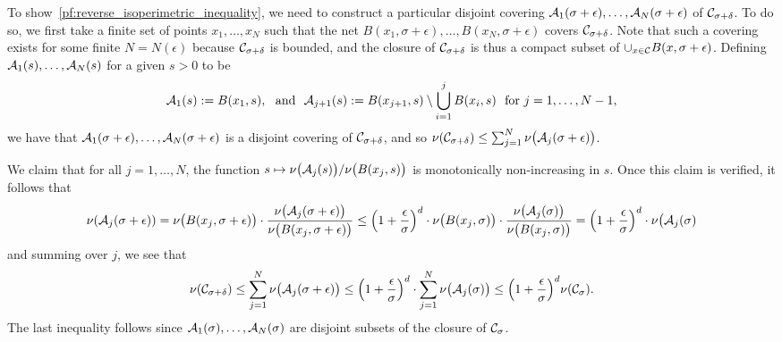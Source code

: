 	To show~\eqref{pf:reverse_isoperimetric_inequality}, we need to construct a particular disjoint covering $\mathcal{A}_1(\sigma + \epsilon), \ldots, \mathcal{A}_N(\sigma + \epsilon)$ of $\mathcal{C}_{\sigma + \delta}$. To do so, we first take a finite set of points $x_1,\ldots,x_N$ such that the net $B(x_1,\sigma + \epsilon),\ldots,B(x_N,\sigma + \epsilon)$ covers $\mathcal{C}_{\sigma + \delta}$.  Note that such a covering exists for some finite $N = N(\epsilon)$ because $\mathcal{C}_{\sigma + \delta}$ is bounded, and the closure of $\mathcal{C}_{\sigma + \delta}$ is thus a compact subset of $\cup_{x \in \mathcal{C}} B(x,\sigma + \epsilon)$. Defining $\mathcal{A}_1(s), \ldots, \mathcal{A}_N(s)$ for a given $s > 0$ to be
	\begin{equation*}
	\mathcal{A}_1(s) := B(x_1,s),~~\textrm{and}~~ \mathcal{A}_{j + 1}(s) := B(x_{j + 1},s) \setminus \bigcup_{i = 1}^{j} B(x_i,s) ~~\textrm{for $j = 1,\ldots,N - 1$},
	\end{equation*}
	we have that $\mathcal{A}_1(\sigma + \epsilon),\ldots,\mathcal{A}_N(\sigma + \epsilon)$ is a disjoint covering of $\mathcal{C}_{\sigma + \delta}$, and so $\nu(\mathcal{C}_{\sigma + \delta}) \leq \sum_{j = 1}^{N} \nu\bigl(\mathcal{A}_j(\sigma + \epsilon)\bigr)$. 
	
	We claim that for all $j = 1,\ldots,N$, the function $s \mapsto \nu\bigl(\mathcal{A}_j(s)\bigr)/\nu\bigl(B(x_j,s)\bigr)$ is monotonically non-increasing in $s$. Once this claim is verified, it follows that
	\begin{equation*}
	\nu(\mathcal{A}_j(\sigma + \epsilon)) = \nu\bigl(B(x_j,\sigma + \epsilon)\bigr) \cdot \frac{\nu\bigl(\mathcal{A}_j(\sigma + \epsilon)\bigr)}{\nu\bigl(B(x_j,\sigma + \epsilon)\bigr)} \leq \Bigl(1 + \frac{\epsilon}{\sigma}\Bigr)^d \cdot  \nu\bigl(B(x_j,\sigma)\bigr) \cdot \frac{\nu\bigl(\mathcal{A}_j(\sigma)\bigr)}{\nu\bigl(B(x_j,\sigma)\bigr)} = \Bigl(1 + \frac{\epsilon}{\sigma}\Bigr)^d \cdot \nu\bigl(\mathcal{A}_j(\sigma)
	\end{equation*}
	and summing over $j$, we see that
	\begin{equation*}
	\nu(\mathcal{C}_{\sigma + \delta}) \leq \sum_{j = 1}^{N} \nu\bigl(\mathcal{A}_j(\sigma + \epsilon)\bigr) \leq \Bigl(1 + \frac{\epsilon}{\sigma}\Bigr)^d \cdot \sum_{j = 1}^{N} \nu\bigl(\mathcal{A}_j(\sigma)\bigr) \leq \Bigl(1 + \frac{\epsilon}{\sigma}\Bigr)^d \nu(\mathcal{C}_{\sigma}).
	\end{equation*}
	The last inequality follows since $\mathcal{A}_1(\sigma),\ldots,\mathcal{A}_N(\sigma)$ are disjoint subsets of the closure of $\mathcal{C}_{\sigma}$.
	

